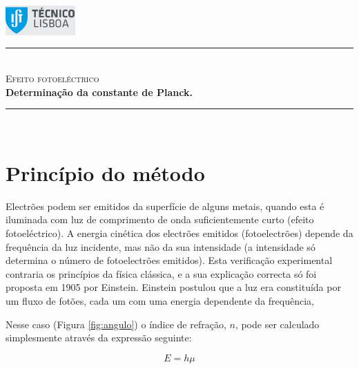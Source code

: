 \documentclass[a4paper,12pt]{article}  %
\author{Prof. Bernardo B. Carvalho}
\date{ Outubro 2014}
\newcommand{\HRule}{\rule{\linewidth}{0.5mm}}
\begin{document}
 

	\includegraphics[width=0.2\textwidth]{../logo-ist}%

	\HRule \\[0.5cm]
	{ \huge \sf  \textsc{Efeito fotoeléctrico}} \\[0.4cm] %
	{ \large \bfseries Determinação da constante de Planck.}\\
	\HRule \\%

\section{\sf Princípio do método}
Electrões podem ser emitidos da superfície de alguns metais, quando esta é iluminada com luz
de comprimento de onda suficientemente curto (efeito fotoeléctrico). A energia cinética dos
electrões emitidos (fotoelectrões) depende da frequência da luz incidente, mas não da sua
intensidade (a intensidade só determina o número de fotoelectrões emitidos). Esta verificação
experimental contraria os princípios da física clássica, e a sua explicação correcta só foi
proposta em 1905 por Einstein. Einstein postulou que a luz era constituída por um fluxo de
fotões, cada um com uma energia dependente da frequência,


Nesse caso  (Figura \ref{fig:angulo}) o índice de refração, $n$, pode ser calculado simplesmente através da expressão seguinte: 

\begin{equation}
	\label{eq:energia}
	E= h \mu
\end{equation}

~
\newpage
\end{document}

